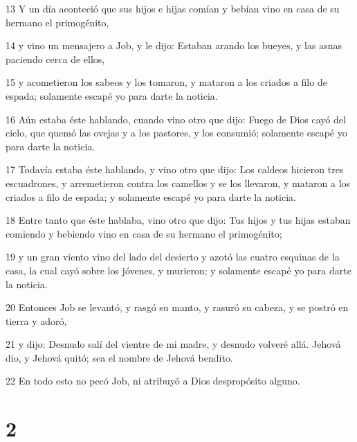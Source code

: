 \par 13 Y un día aconteció que sus hijos e hijas comían y bebían vino en casa de su hermano el primogénito,
\par 14 y vino un mensajero a Job, y le dijo: Estaban arando los bueyes, y las asnas paciendo cerca de ellos,
\par 15 y acometieron los sabeos y los tomaron, y mataron a los criados a filo de espada; solamente escapé yo para darte la noticia.
\par 16 Aún estaba éste hablando, cuando vino otro que dijo: Fuego de Dios cayó del cielo, que quemó las ovejas y a los pastores, y los consumió; solamente escapé yo para darte la noticia.
\par 17 Todavía estaba éste hablando, y vino otro que dijo: Los caldeos hicieron tres escuadrones, y arremetieron contra los camellos y se los llevaron, y mataron a los criados a filo de espada; y solamente escapé yo para darte la noticia.
\par 18 Entre tanto que éste hablaba, vino otro que dijo: Tus hijos y tus hijas estaban comiendo y bebiendo vino en casa de su hermano el primogénito;
\par 19 y un gran viento vino del lado del desierto y azotó las cuatro esquinas de la casa, la cual cayó sobre los jóvenes, y murieron; y solamente escapé yo para darte la noticia.
\par 20 Entonces Job se levantó, y rasgó su manto, y rasuró su cabeza, y se postró en tierra y adoró,
\par 21 y dijo: Desnudo salí del vientre de mi madre, y desnudo volveré allá. Jehová dio, y Jehová quitó; sea el nombre de Jehová bendito.
\par 22 En todo esto no pecó Job, ni atribuyó a Dios despropósito alguno.

\chapter{2}

